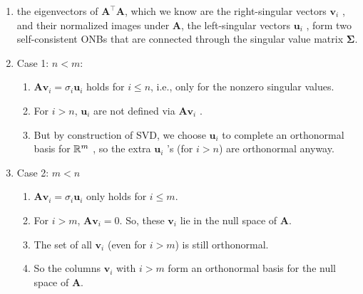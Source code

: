\begin{enumerate}
\begin{enumerate}
    \end{enumerate}

    \item the eigenvectors of $\bm{A} ^\top \bm{A}$, which we know are the right-singular vectors $\bm{v}_i$ , and their normalized images under $\bm{A}$, the left-singular vectors $\bm{u}_i$ , form two self-consistent ONBs that are connected through the singular value matrix $\bm{\Sigma}$.
    \hfill \cite{mfml/book/mml/Deisenroth-Faisal-Ong}

    \item Case 1: $n<m$:
    \begin{enumerate}
        \item $\bm{Av}_i = \sigma_i \bm{u}_i$ holds for $i\leq n$, i.e., only for the nonzero singular values.
        \hfill \cite{mfml/book/mml/Deisenroth-Faisal-Ong, common/online/chatgpt}

        \item For $i>n$, $\bm{u} _i$  are not defined via $\bm{Av}_ i$ .
        \hfill \cite{mfml/book/mml/Deisenroth-Faisal-Ong, common/online/chatgpt}

        \item But by construction of SVD, we choose $\bm{u}_ i$  to complete an orthonormal basis for $\mathbb{R}^ m$ , so the extra $\bm{u}_ i$ 's (for $i>n$) are orthonormal anyway.
        \hfill \cite{mfml/book/mml/Deisenroth-Faisal-Ong, common/online/chatgpt}
    \end{enumerate}

    \item Case 2: $m<n$
    \begin{enumerate}
        \item $\bm{Av}_i = \sigma_i \bm{u}_i$ only holds for $i\leq m$.
        \hfill \cite{mfml/book/mml/Deisenroth-Faisal-Ong, common/online/chatgpt}

        \item For $i>m$, $\bm{Av}_ i =0$. So, these $\bm{v}_ i$  lie in the null space of $\bm{A}$.
        \hfill \cite{mfml/book/mml/Deisenroth-Faisal-Ong, common/online/chatgpt}

        \item The set of all $\bm{v}_ i$  (even for $i>m$) is still orthonormal.
        \hfill \cite{mfml/book/mml/Deisenroth-Faisal-Ong, common/online/chatgpt}

        \item So the columns $\bm{v}_ i$  with $i>m$ form an orthonormal basis for the null space of $\bm{A}$.
        \hfill \cite{mfml/book/mml/Deisenroth-Faisal-Ong, common/online/chatgpt}
    \end{enumerate}
\end{enumerate}





